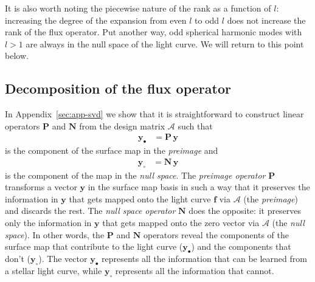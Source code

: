 \documentclass[modern]{aastex62}
\begin{document}
It is also worth noting the piecewise nature of the rank as a function of
$l$: increasing the degree of the expansion from even $l$ to odd $l$ does not
increase the rank of the flux operator. Put another way, odd spherical
harmonic modes with $l > 1$ are always in the null space of the light curve.
We will return to this point below.

\subsection{Decomposition of the flux operator}
%
\label{sec:svd}
%
In Appendix~\ref{sec:app-svd} we show that it is straightforward to
construct linear operators $\mathbf{P}$ and $\mathbf{N}$ from the
design matrix $\pmb{\mathcal{A}}$ such that
%
\begin{align}
    \mathbf{y}_\bullet & = \mathbf{P} \, \mathbf{y}
\end{align}
%
is the component of the surface map in the \emph{preimage} and
%
\begin{align}
    \mathbf{y}_\circ & = \mathbf{N} \, \mathbf{y}
\end{align}
%
is the component of the map in the \emph{null space}.
%
The \emph{preimage operator} $\mathbf{P}$
transforms a vector $\mathbf{y}$ in the surface map basis in such a way
that it preserves the information in $\mathbf{y}$ that gets mapped
onto the light curve $\mathbf{f}$ via $\pmb{\mathcal{A}}$ (the \emph{preimage}) and discards the rest. The
\emph{null space operator} $\mathbf{N}$ does the opposite: it preserves only
the information in $\mathbf{y}$ that gets mapped onto the zero
vector via $\pmb{\mathcal{A}}$ (the \emph{null space}).
%
In other words,
the $\mathbf{P}$ and $\mathbf{N}$ operators reveal the
components of the surface map that contribute to the
light curve ($\mathbf{y}_\bullet$) and the components that don't ($\mathbf{y}_\circ$).
The vector $\mathbf{y}_\bullet$ represents all the information that can be
learned from a stellar light curve, while $\mathbf{y}_\circ$ represents all the
information that cannot.
\end{document}
